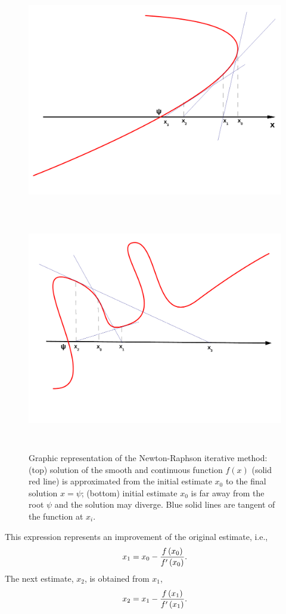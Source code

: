      \begin{figure}[h]\label{Appendix:Fig:NewtonRaphson}%
        \begin{center}
         \vbox{
           \hbox{\includegraphics[width=\columnwidth,height=10cm]{./../Pics/NewtonRaphson2}}
           \hbox{\includegraphics[width=\columnwidth,height=10cm]{./../Pics/NewtonRaphson3}}}
           \vspace{-1cm}
           \caption{Graphic representation of the Newton-Raphson iterative method: (top) solution of the smooth and continuous function $f(x)$ (solid red line) is approximated from the initial estimate $x_{0}$ to the final solution $x=\psi$; (bottom) initial estimate $x_{0}$ is far away from the root $\psi$ and the solution may diverge. Blue solid lines are tangent of the function at $x_{i}$.} 
        \end{center}
      \end{figure}
%
This expression represents an improvement of the original estimate, i.e.,  
   \begin{displaymath}
        x_{1} = x_{0} -\displaystyle\frac{f\left(x_{0}\right)}{f'\left(x_{0}\right)}.
   \end{displaymath}
The next estimate, $x_{2}$, is obtained from $x_{1}$, 
   \begin{displaymath}
        x_{2} = x_{1} -\displaystyle\frac{f\left(x_{1}\right)}{f'\left(x_{1}\right)}.
   \end{displaymath}

